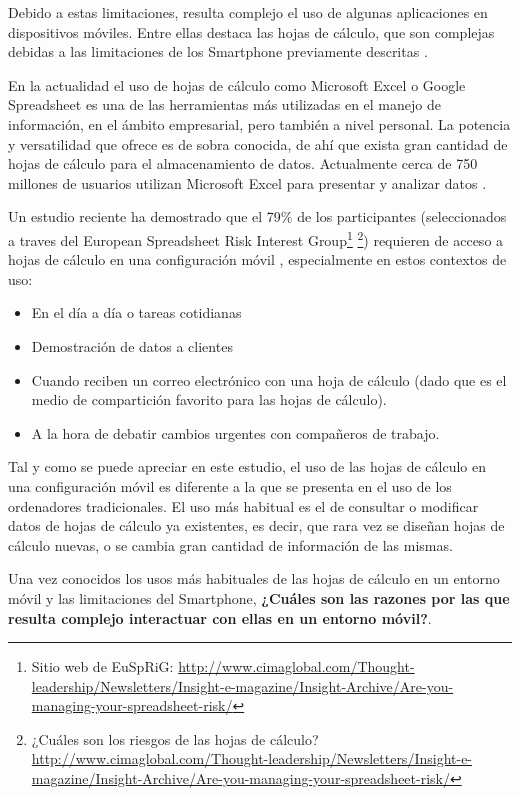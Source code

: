 Debido a estas limitaciones, resulta complejo el uso de algunas aplicaciones en dispositivos móviles. Entre ellas destaca las hojas de cálculo, que son complejas debidas a las limitaciones de los Smartphone previamente descritas \cite{Flood2010}.

En la actualidad el uso de hojas de cálculo como Microsoft Excel o Google Spreadsheet es una de las herramientas más utilizadas en el manejo de información, en el ámbito empresarial, pero también a nivel personal. La potencia y versatilidad que ofrece es de sobra conocida, de ahí que exista gran cantidad de hojas de cálculo para el almacenamiento de datos. Actualmente cerca de 750 millones de usuarios utilizan Microsoft Excel para presentar y analizar datos \cite{Investitech2015}.

Un estudio reciente ha demostrado que el 79\% de los participantes (seleccionados a traves del European Spreadsheet Risk Interest Group\footnote{Sitio web de EuSpRiG: \url{http://www.cimaglobal.com/Thought-leadership/Newsletters/Insight-e-magazine/Insight-Archive/Are-you-managing-your-spreadsheet-risk/}} \footnote{¿Cuáles son los riesgos de las hojas de cálculo? \url{http://www.cimaglobal.com/Thought-leadership/Newsletters/Insight-e-magazine/Insight-Archive/Are-you-managing-your-spreadsheet-risk/}}) requieren de acceso a hojas de cálculo en una configuración móvil \cite{Flood2011SpreadsheetsMove}, especialmente en estos contextos de uso:
\begin{itemize}
	\item En el día a día o tareas cotidianas
	\item Demostración de datos a clientes
	\item Cuando reciben un correo electrónico con una hoja de cálculo (dado que es el medio de compartición favorito para las hojas de cálculo).
	\item A la hora de debatir cambios urgentes con compañeros de trabajo.
\end{itemize}

Tal y como se puede apreciar en este estudio, el uso de las hojas de cálculo en una configuración móvil es diferente a la que se presenta en el uso de los ordenadores tradicionales. El uso más habitual es el de consultar o modificar datos de hojas de cálculo ya existentes, es decir, que rara vez se diseñan hojas de cálculo nuevas, o se cambia gran cantidad de información de las mismas.

Una vez conocidos los usos más habituales de las hojas de cálculo en un entorno móvil y las limitaciones del Smartphone, \textbf{¿Cuáles son las razones por las que resulta complejo interactuar con ellas en un entorno móvil?}.


